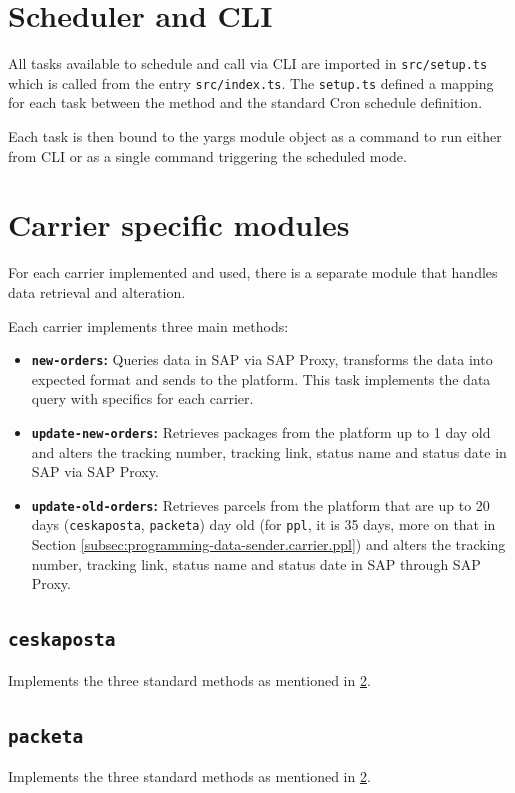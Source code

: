 \section{Scheduler and \ac{CLI}}
All tasks available to schedule and call via \ac{CLI} are imported in \texttt{src/setup.ts} which is called from the entry \texttt{src/index.ts}.
The \texttt{setup.ts} defined a mapping for each task between the method and the standard Cron schedule definition.

Each task is then bound to the \gls{yargs} module object as a command to run either from \ac{CLI} or as a single command triggering the scheduled mode.

\section{Carrier specific modules}
\label{subsec:programming-data-sender.carrier}

For each carrier implemented and used, there is a separate module that handles data retrieval and alteration.

Each carrier implements three main methods: 
\begin{itemize}
    \item \textbf{\texttt{new-orders}:} Queries data in SAP via SAP Proxy, transforms the data into expected format and sends to the platform. This task implements the data query with specifics for each carrier. 
    \item \textbf{\texttt{update-new-orders}:} Retrieves packages from the platform up to 1 day old and alters the tracking number, tracking link, status name and status date in SAP via SAP Proxy.
    \item \textbf{\texttt{update-old-orders}:} Retrieves parcels from the platform that are up to 20 days (\texttt{ceskaposta}, \texttt{packeta}) day old (for \texttt{ppl}, it is 35 days, more on that in Section \ref{subsec:programming-data-sender.carrier.ppl}) and alters the tracking number, tracking link, status name and status date in SAP through SAP Proxy.
\end{itemize}
\subsection{\texttt{ceskaposta}}
Implements the three standard methods as mentioned in \ref{subsec:programming-data-sender.carrier}.
\subsection{\texttt{packeta}}
Implements the three standard methods as mentioned in \ref{subsec:programming-data-sender.carrier}.
